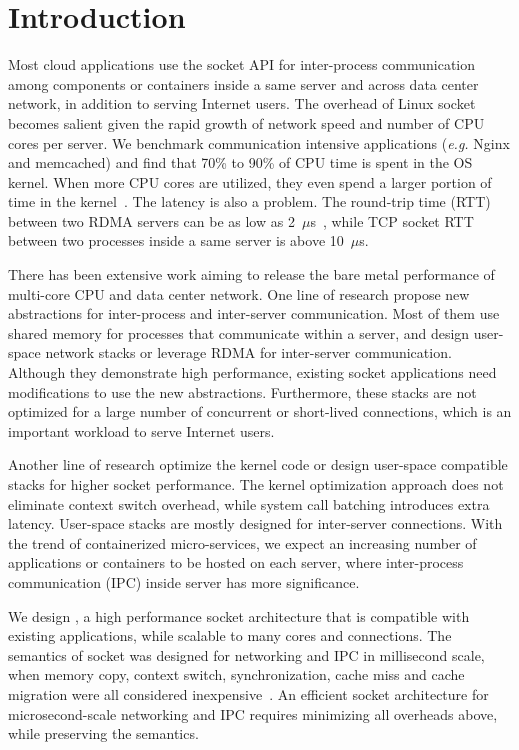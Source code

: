 \section{Introduction}
\label{sec:intro}

Most cloud applications use the socket API for inter-process communication among components or containers inside a same server and across data center network, in addition to serving Internet users. The overhead of Linux socket becomes salient given the rapid growth of network speed and number of CPU cores per server. We benchmark communication intensive applications (\textit{e.g.} Nginx and memcached) and find that 70\% to 90\% of CPU time is spent in the OS kernel. When more CPU cores are utilized, they even spend a larger portion of time in the kernel~\cite{boyd2010analysis}. The latency is also a problem. The round-trip time (RTT) between two RDMA servers can be as low as 2~$\mu$s~\cite{kaminsky2016design}, while TCP socket RTT between two processes inside a same server is above 10~$\mu$s.

There has been extensive work aiming to release the bare metal performance of multi-core CPU and data center network. One line of research propose new abstractions for inter-process and inter-server communication. Most of them use shared memory for processes that communicate within a server, and design user-space network stacks or leverage RDMA for inter-server communication. Although they demonstrate high performance, existing socket applications need modifications to use the new abstractions. Furthermore, these stacks are not optimized for a large number of concurrent or short-lived connections, which is an important workload to serve Internet users.

Another line of research optimize the kernel code or design user-space compatible stacks for higher socket performance. The kernel optimization approach does not eliminate context switch overhead, while system call batching introduces extra latency. User-space stacks are mostly designed for inter-server connections. With the trend of containerized micro-services, we expect an increasing number of applications or containers to be hosted on each server, where inter-process communication (IPC) inside server has more significance.

We design \sys{}, a high performance socket architecture that is compatible with existing applications, while scalable to many cores and connections. The semantics of socket was designed for networking and IPC in millisecond scale, when memory copy, context switch, synchronization, cache miss and cache migration were all considered inexpensive~\cite{barroso2017attack}. An efficient socket architecture for microsecond-scale networking and IPC requires minimizing all overheads above, while preserving the semantics.

